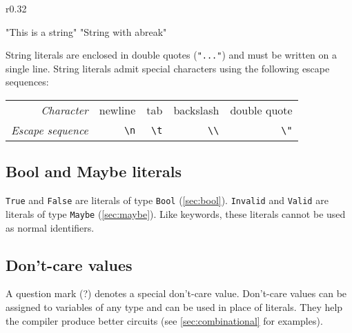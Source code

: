 \begin{wrapfigure}{r}{0.32\columnwidth}
\vspace{-2em}
\begin{mscode}
"This is a string"
"String with a\nline break"
\end{mscode}
\vspace{-2em}
\end{wrapfigure}

String literals are enclosed in double quotes (\verb|"..."|) and must be written on a single line.
String literals admit special characters using the following escape sequences:

\begin{tabular}{rrrrr}
  \emph{Character} & newline & tab & backslash & double quote \\
  \emph{Escape sequence} & \verb|\n| & \verb|\t| & \verb|\\|& \verb|\"| \\
\end{tabular}

\subsection{Bool and Maybe literals}

\verb|True| and \verb|False| are literals of type \verb|Bool| (\autoref{sec:bool}).
\verb|Invalid| and \verb|Valid| are literals of type \verb|Maybe| (\autoref{sec:maybe}).
Like keywords, these literals cannot be used as normal identifiers.

\subsection{Don't-care values}
\label{sec:dontCares}

A question mark (?) denotes a special don't-care value.
Don't-care values can be assigned to variables of any type and can be used in place of literals.
They help the compiler produce better circuits (see \autoref{sec:combinational} for examples). %

